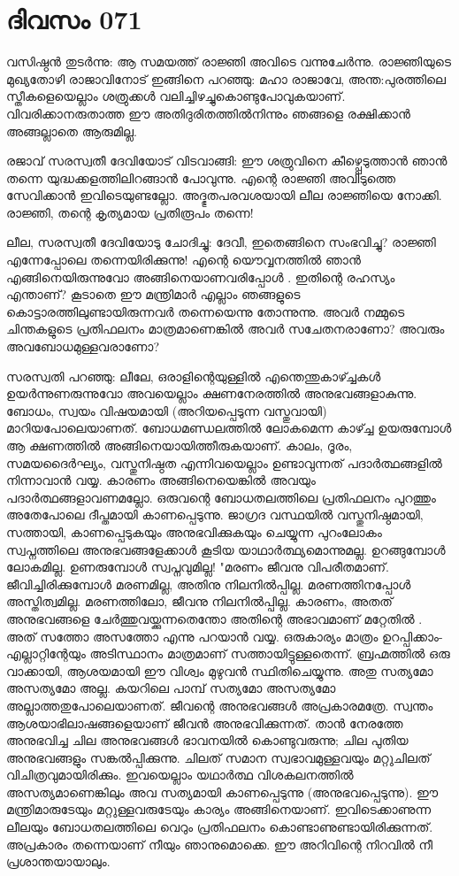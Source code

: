 \newpage
\section{ദിവസം 071}


വസിഷ്ഠന്‍ തുടര്‍ന്നു: ആ സമയത്ത്‌ രാജ്ഞി അവിടെ വന്നുചേര്‍ന്നു. രാജ്ഞിയുടെ മുഖ്യതോഴി രാജാവിനോട്‌ ഇങ്ങിനെ പറഞ്ഞു: മഹാ രാജാവേ, അന്ത:പുരത്തിലെ സ്തീകളെയെല്ലാം ശത്രുക്കള്‍ വലിച്ചിഴച്ചുകൊണ്ടുപോവുകയാണ്‌. വിവരിക്കാനരുതാത്ത ഈ അതിദുരിതത്തില്‍നിന്നും ഞങ്ങളെ രക്ഷിക്കാന്‍ അങ്ങല്ലാതെ ആരുമില്ല.

രജാവ്‌ സരസ്വതീ ദേവിയോട്‌ വിടവാങ്ങി: ഈ ശത്രുവിനെ കീഴ്പ്പെടുത്താന്‍ ഞാന്‍ തന്നെ യുദ്ധക്കളത്തിലിറങ്ങാന്‍ പോവുന്നു. എന്റെ രാജ്ഞി അവിടുത്തെ സേവിക്കാന്‍ ഇവിടെയുണ്ടല്ലോ. അദ്ഭുതപരവശയായി ലീല രാജ്ഞിയെ നോക്കി. രാജ്ഞി, തന്റെ കൃത്യമായ പ്രതിരൂപം തന്നെ!

ലീല, സരസ്വതീ ദേവിയോടു ചോദിച്ചു: ദേവീ, ഇതെങ്ങിനെ സംഭവിച്ചു? രാജ്ഞി എന്നേപ്പോലെ തന്നെയിരിക്കുന്നു! എന്റെ യൌവ്വനത്തില്‍ ഞാന്‍ എങ്ങിനെയിരുന്നുവോ അങ്ങിനെയാണവരിപ്പോള്‍ . ഇതിന്റെ രഹസ്യം എന്താണ്‌? കൂടാതെ ഈ മന്ത്രിമാര്‍ എല്ലാം ഞങ്ങളുടെ കൊട്ടാരത്തിലുണ്ടായിരുന്നവര്‍ തന്നെയെന്നു തോന്നുന്നു. അവര്‍ നമ്മുടെ ചിന്തകളുടെ പ്രതിഫലനം മാത്രമാണെങ്കില്‍ അവര്‍ സചേതനരാണോ? അവരും അവബോധമുള്ളവരാണോ?

സരസ്വതി പറഞ്ഞു: ലീലേ, ഒരാളിന്റെയുള്ളില്‍ എന്തെന്തുകാഴ്ച്ചകള്‍ ഉയര്‍ന്നുണരുന്നുവോ അവയെല്ലാം ക്ഷണനേരത്തില്‍ അനുഭവങ്ങളാകുന്നു. ബോധം, സ്വയം വിഷയമായി (അറിയപ്പെടുന്ന വസ്തുവായി) മാറിയപോലെയാണത്‌. ബോധമണ്ഡലത്തില്‍ ലോകമെന്ന കാഴ്ച്ച ഉയരുമ്പോള്‍ ആ ക്ഷണത്തില്‍ അങ്ങിനെയായിത്തീരുകയാണ്‌. കാലം, ദൂരം, സമയദൈര്‍ഘ്യം, വസ്തുനിഷ്ഠത എന്നിവയെല്ലാം ഉണ്ടാവുന്നത്‌ പദാര്‍ത്ഥങ്ങളില്‍ നിന്നാവാന്‍ വയ്യ. കാരണം അങ്ങിനെയെങ്കില്‍ അവയും പദാര്‍ത്ഥങ്ങളാവണമല്ലോ. ഒരുവന്റെ ബോധതലത്തിലെ പ്രതിഫലനം പുറത്തും അതേപോലെ ദീപ്തമായി കാണപ്പെടുന്നു. ജാഗ്രദ വസ്ഥയില്‍ വസ്തുനിഷ്ഠമായി, സത്തായി, കാണപ്പെടുകയും അനുഭവിക്കുകയും ചെയ്യുന്ന പുറംലോകം സ്വപ്നത്തിലെ അനുഭവങ്ങളേക്കാള്‍ കൂടിയ യാഥാര്‍ത്ഥ്യമൊന്നുമല്ല. ഉറങ്ങുമ്പോള്‍ ലോകമില്ല. ഉണരുമ്പോള്‍ സ്വപ്നവുമില്ല! "മരണം ജീവനു വിപരീതമാണ്‌. ജീവിച്ചിരിക്കുമ്പോള്‍ മരണമില്ല, അതിനു നിലനില്‍പ്പില്ല. മരണത്തിനപ്പോള്‍ അസ്തിത്വമില്ല. മരണത്തിലോ, ജീവനു നിലനില്‍പ്പില്ല. കാരണം, അതത്‌ അനുഭവങ്ങളെ ചേര്‍ത്തുവയ്ക്കുന്നതെന്തോ അതിന്റെ അഭാവമാണ്‌ മറ്റേതില്‍ . അത്‌ സത്തോ അസത്തോ എന്നു പറയാന്‍ വയ്യ. ഒരുകാര്യം മാത്രം ഉറപ്പിക്കാം- എല്ലാറ്റിന്റേയും അടിസ്ഥാനം മാത്രമാണ്‌ സത്തായിട്ടുള്ളതെന്ന്. ബ്രഹ്മത്തില്‍ ഒരു വാക്കായി, ആശയമായി ഈ വിശ്വം മുഴുവന്‍ സ്ഥിതിചെയ്യുന്നു. അതു സത്യമോ അസത്യമോ അല്ല. കയറിലെ പാമ്പ്‌ സത്യമോ അസത്യമോ അല്ലാത്തതുപോലെയാണത്‌. ജീവന്റെ അനുഭവങ്ങള്‍ അപ്രകാരമത്രേ. സ്വന്തം ആശയാഭിലാഷങ്ങളെയാണ്‌ ജീവന്‍ അനുഭവിക്കുന്നത്‌. താന്‍ നേരത്തേ അനുഭവിച്ച ചില അനുഭവങ്ങള്‍ ഭാവനയില്‍ കൊണ്ടുവരുന്നു; ചില പുതിയ അനുഭവങ്ങളും സങ്കല്‍പ്പിക്കുന്നു. ചിലത്‌ സമാന സ്വഭാവമുള്ളവയും മറ്റുചിലത്‌ വിചിത്രവുമായിരിക്കും. ഇവയെല്ലാം യഥാര്‍ത്ഥ വിശകലനത്തില്‍ അസത്യമാണെങ്കിലും അവ സത്യമായി കാണപ്പെടുന്നു (അനുഭവപ്പെടുന്നു). ഈ മന്ത്രിമാരുടേയും മറ്റുള്ളവരുടേയും കാര്യം അങ്ങിനെയാണ്‌. ഇവിടെക്കാണുന്ന ലീലയും ബോധതലത്തിലെ വെറും പ്രതിഫലനം കൊണ്ടാണുണ്ടായിരിക്കുന്നത്‌. അപ്രകാരം തന്നെയാണ്‌ നീയും ഞാനുമൊക്കെ. ഈ അറിവിന്റെ നിറവില്‍ നീ പ്രശാന്തയായാലും.
